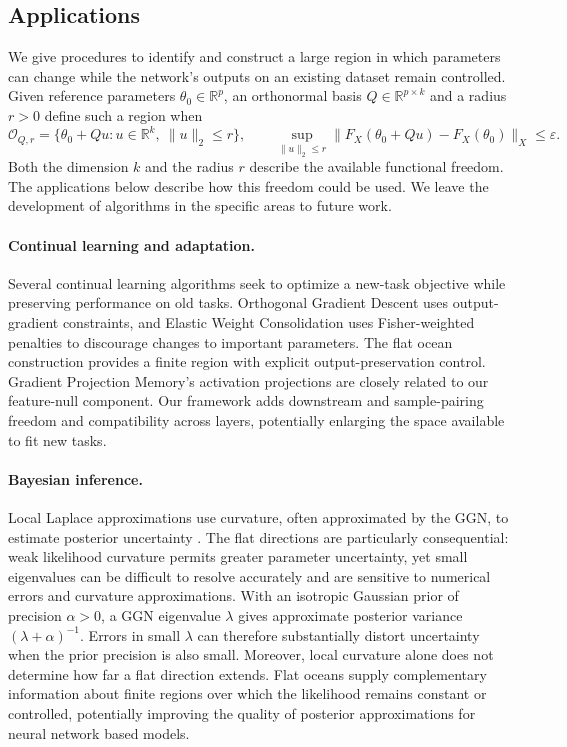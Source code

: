 \subsection{Applications}
\label{app:finite-invariance-uses}

We give procedures to identify and construct a large region in which parameters can change while the network's outputs on an existing dataset remain controlled. Given reference parameters $\theta_0\in\mathbb R^p$, an orthonormal basis $Q\in\mathbb R^{p\times k}$ and a radius $r>0$ define such a region when
\begin{equation}
\mathcal O_{Q,r}=\{\theta_0+Qu:u\in\mathbb R^k,\ \|u\|_2\le r\},
\qquad
\sup_{\|u\|_2\le r}\|F_X(\theta_0+Qu)-F_X(\theta_0)\|_X\le\varepsilon.
\label{eq:operational-ocean}
\end{equation}
Both the dimension $k$ and the radius $r$ describe the available functional freedom. The applications below describe how this freedom could be used. We leave the development of algorithms in the specific areas to future work. 

\paragraph{Continual learning and adaptation.}
Several continual learning algorithms seek to optimize a new-task objective while preserving performance on old tasks. Orthogonal Gradient Descent \citep{farajtabar2020ogd} uses output-gradient constraints, and Elastic Weight Consolidation \citep{kirkpatrick2017ewc} uses Fisher-weighted penalties to discourage changes to important parameters. The flat ocean construction provides a finite region with explicit output-preservation control. Gradient Projection Memory's activation projections \citep{saha2021gpm} are closely related to our feature-null component. Our framework adds downstream and sample-pairing freedom and compatibility across layers, potentially enlarging the space available to fit new tasks.

\paragraph{Bayesian inference.}
Local Laplace approximations use curvature, often approximated by the GGN, to estimate posterior uncertainty \citep{daxberger2021laplace,immer2021linearization}. The flat directions are particularly consequential: weak likelihood curvature permits greater parameter uncertainty, yet small eigenvalues can be difficult to resolve accurately and are sensitive to numerical errors and curvature approximations. With an isotropic Gaussian prior of precision $\alpha>0$, a GGN eigenvalue $\lambda$ gives approximate posterior variance $(\lambda+\alpha)^{-1}$. Errors in small $\lambda$ can therefore substantially distort uncertainty when the prior precision is also small. Moreover, local curvature alone does not determine how far a flat direction extends. Flat oceans supply complementary information about finite regions over which the likelihood remains constant or controlled, potentially improving the quality of posterior approximations for neural network based models. 

